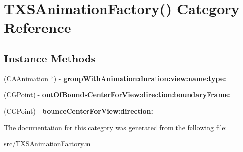 \hypertarget{category_t_x_s_animation_factory_07_08}{}\section{T\+X\+S\+Animation\+Factory() Category Reference}
\label{category_t_x_s_animation_factory_07_08}
\subsection*{Instance Methods}
\begin{DoxyCompactItemize}
\item 
\hypertarget{category_t_x_s_animation_factory_07_08_a9cbb81a17a70c64fc4f85931b6b2d674}{}(C\+A\+Animation $\ast$) -\/ {\bfseries group\+With\+Animation\+:duration\+:view\+:name\+:type\+:}\label{category_t_x_s_animation_factory_07_08_a9cbb81a17a70c64fc4f85931b6b2d674}

\item 
\hypertarget{category_t_x_s_animation_factory_07_08_ab9bc49efdc8155752b9119fe4e14c25b}{}(C\+G\+Point) -\/ {\bfseries out\+Of\+Bounds\+Center\+For\+View\+:direction\+:boundary\+Frame\+:}\label{category_t_x_s_animation_factory_07_08_ab9bc49efdc8155752b9119fe4e14c25b}

\item 
\hypertarget{category_t_x_s_animation_factory_07_08_a47a0e1dd397a09c0eea23cd919b64d12}{}(C\+G\+Point) -\/ {\bfseries bounce\+Center\+For\+View\+:direction\+:}\label{category_t_x_s_animation_factory_07_08_a47a0e1dd397a09c0eea23cd919b64d12}

\end{DoxyCompactItemize}


The documentation for this category was generated from the following file\+:\begin{DoxyCompactItemize}
\item 
src/T\+X\+S\+Animation\+Factory.\+m\end{DoxyCompactItemize}
